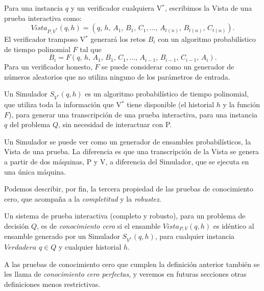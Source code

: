 Para una instancia $q$ y un verificador cualquiera V$^*$, escribimos la Vista de una prueba interactiva como:
\[ Vista_{P,V^*}(q,h) = (q,\,h,\,A_1,\,B_1,\,C_1, \dots ,\,A_{t(n)},\,B_{t(n)},\,C_{t(n)}). \]
El verificador tramposo V$^*$ generará los retos $B_i$ con un algoritmo probabilístico de tiempo polinomial $F$ tal que
\[ B_i = F(q,\,h,\,A_1,\,B_1,\,C_1, \dots ,\,A_{i-1},\,B_{i-1},\,C_{i-1},\,A_i). \]
Para un verificador honesto, $F$ se puede considerar como un generador de números aleatorios que no utiliza ninguno de los parámetros de entrada.



\begin{definition}
	Un Simulador $S_{V^*}(q,h)$ es un algoritmo probabilístico de tiempo polinomial, que utiliza toda la información que V$^*$ tiene disponible (el historial $h$ y la función $F$), para generar una transcripción de una prueba interactiva, para una instancia $q$ del problema $Q$, sin necesidad de interactuar con P.
\end{definition}

Un Simulador se puede ver como un generador de ensambles probabilísticos, la Vista de una prueba. La diferencia es que una transcripción de la Vista se genera a partir de dos máquinas, P y V, a diferencia del Simulador, que se ejecuta en una única máquina.


\hfil

Podemos describir, por fin, la tercera propiedad de las pruebas de conocimiento cero, que acompaña a la \textit{completitud} y la \textit{robustez}.



\begin{definition}	
	Un sistema de prueba interactiva (completo y robusto), para un problema de decisión $Q$, es de \textit{conocimiento cero} si el ensamble $Vista_{P,V}(q,h)$ es idéntico al ensamble generado por un Simulador $S_{V^*}(q,h)$, para cualquier instancia $Verdadera$ $q\in Q$ y cualquier historial $h$.
\end{definition}

A las pruebas de conocimiento cero que cumplen la definición anterior también se les llama de \textit{conocimiento cero perfectas}, y veremos en futuras secciones otras definiciones menos restrictivas.

